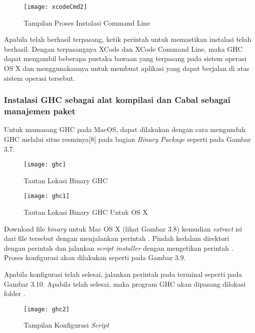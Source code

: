 \documentclass[pi.tex]{subfile}
\begin{document}
  \begin{figure}[H]
      \centering
  \texttt{[image: xcodeCmd2]}
  \caption[Tampilan Proses Instalasi Command Line]{Tampilan Proses Instalasi Command Line}
  \end{figure}

  \hspace{10pt}Apabila telah berhasil terpasang, ketik perintah  untuk memastikan instalasi telah berhasil. Dengan terpasangnya XCode dan XCode Command Line, maka GHC dapat mengambil beberapa pustaka bawaan yang terpasang pada sistem operasi OS X dan menggunakannya untuk membuat aplikasi yang dapat berjalan di atas sistem operasi tersebut.
  
\subsubsection{Instalasi GHC sebagai alat kompilasi dan Cabal sebagai manajemen paket}\hspace{10pt}
Untuk mamasang GHC pada MacOS, dapat dilakukan dengan cara mengunduh GHC melalui situs resminya[8] pada bagian \emph{Binary Package} seperti pada Gambar 3.7.

  \begin{figure}[H]
      \centering
  \texttt{[image: ghc]}
  \caption[Tautan Lokasi Binary GHC]{Tautan Lokasi Binary GHC}
  \end{figure}

    \begin{figure}[H]
      \centering
  \texttt{[image: ghc1]}
  \caption[Tautan Lokasi Binary GHC Untuk OS X]{Tautan Lokasi Binary GHC Untuk OS X}
  \end{figure}


    \hspace{10pt}Download file \emph{binary} untuk Mac OS X (lihat Gambar 3.8) kemudian \emph{extract} isi dari file tersebut dengan menjalankan perintah . Pindah kedalam direktori dengan perintah  dan jalankan \emph{script installer} dengan mengetikan perintah . Proses konfigurasi akan dilakukan seperti pada Gambar 3.9.

    \hspace{10pt}Apabila konfigurasi telah selesai, jalankan perintah  pada terminal seperti pada Gambar 3.10. Apabila telah selesai, maka program GHC akan dipasang dilokasi folder .
  \begin{figure}[H]
      \centering
  \texttt{[image: ghc2]}
  \caption[Tampilan Konfigurasi \emph{Script}]{Tampilan Konfigurasi \emph{Script}}
  \end{figure}
\end{document}
